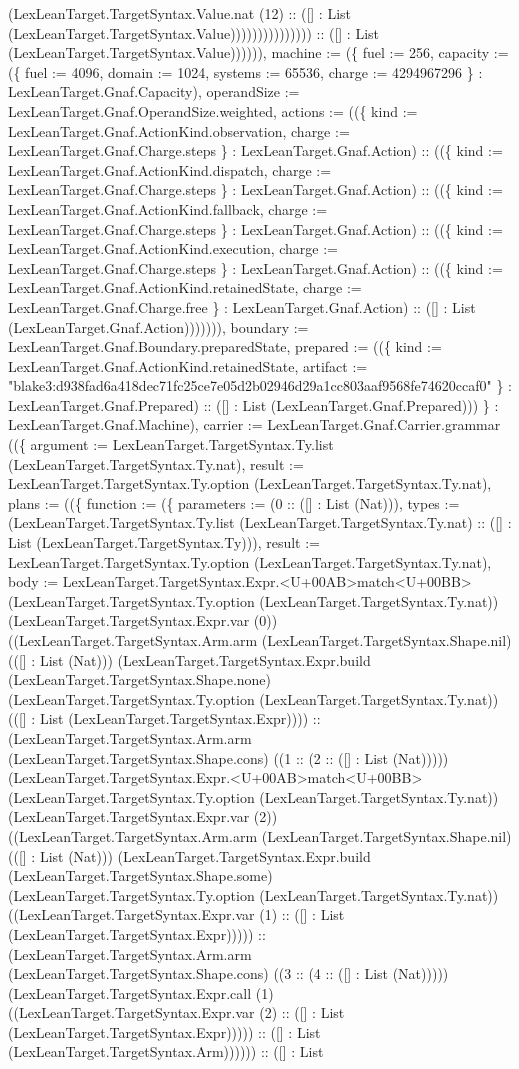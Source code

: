\documentclass[11pt]{article}
\begin{document}
(LexLeanTarget.TargetSyntax.Value.nat (12) :: ([] : List (LexLeanTarget.TargetSyntax.Value))))))))))))))) :: ([] : List (LexLeanTarget.TargetSyntax.Value)))))), machine := (\{ fuel := 256, capacity := (\{ fuel := 4096, domain := 1024, systems := 65536, charge := 4294967296 \} : LexLeanTarget.Gnaf.Capacity), operandSize := LexLeanTarget.Gnaf.OperandSize.weighted, actions := ((\{ kind := LexLeanTarget.Gnaf.ActionKind.observation, charge := LexLeanTarget.Gnaf.Charge.steps \} : LexLeanTarget.Gnaf.Action) :: ((\{ kind := LexLeanTarget.Gnaf.ActionKind.dispatch, charge := LexLeanTarget.Gnaf.Charge.steps \} : LexLeanTarget.Gnaf.Action) :: ((\{ kind := LexLeanTarget.Gnaf.ActionKind.fallback, charge := LexLeanTarget.Gnaf.Charge.steps \} : LexLeanTarget.Gnaf.Action) :: ((\{ kind := LexLeanTarget.Gnaf.ActionKind.execution, charge := LexLeanTarget.Gnaf.Charge.steps \} : LexLeanTarget.Gnaf.Action) :: ((\{ kind := LexLeanTarget.Gnaf.ActionKind.retainedState, charge := LexLeanTarget.Gnaf.Charge.free \} : LexLeanTarget.Gnaf.Action) :: ([] : List (LexLeanTarget.Gnaf.Action))))))), boundary := LexLeanTarget.Gnaf.Boundary.preparedState, prepared := ((\{ kind := LexLeanTarget.Gnaf.ActionKind.retainedState, artifact := "blake3:d938fad6a418dec71fc25ce7e05d2b02946d29a1cc803aaf9568fe74620ccaf0" \} : LexLeanTarget.Gnaf.Prepared) :: ([] : List (LexLeanTarget.Gnaf.Prepared))) \} : LexLeanTarget.Gnaf.Machine), carrier := LexLeanTarget.Gnaf.Carrier.grammar ((\{ argument := LexLeanTarget.TargetSyntax.Ty.list (LexLeanTarget.TargetSyntax.Ty.nat), result := LexLeanTarget.TargetSyntax.Ty.option (LexLeanTarget.TargetSyntax.Ty.nat), plans := ((\{ function := (\{ parameters := (0 :: ([] : List (Nat))), types := (LexLeanTarget.TargetSyntax.Ty.list (LexLeanTarget.TargetSyntax.Ty.nat) :: ([] : List (LexLeanTarget.TargetSyntax.Ty))), result := LexLeanTarget.TargetSyntax.Ty.option (LexLeanTarget.TargetSyntax.Ty.nat), body := LexLeanTarget.TargetSyntax.Expr.<U+00AB>match<U+00BB> (LexLeanTarget.TargetSyntax.Ty.option (LexLeanTarget.TargetSyntax.Ty.nat)) (LexLeanTarget.TargetSyntax.Expr.var (0)) ((LexLeanTarget.TargetSyntax.Arm.arm (LexLeanTarget.TargetSyntax.Shape.nil) (([] : List (Nat))) (LexLeanTarget.TargetSyntax.Expr.build (LexLeanTarget.TargetSyntax.Shape.none) (LexLeanTarget.TargetSyntax.Ty.option (LexLeanTarget.TargetSyntax.Ty.nat)) (([] : List (LexLeanTarget.TargetSyntax.Expr)))) :: (LexLeanTarget.TargetSyntax.Arm.arm (LexLeanTarget.TargetSyntax.Shape.cons) ((1 :: (2 :: ([] : List (Nat))))) (LexLeanTarget.TargetSyntax.Expr.<U+00AB>match<U+00BB> (LexLeanTarget.TargetSyntax.Ty.option (LexLeanTarget.TargetSyntax.Ty.nat)) (LexLeanTarget.TargetSyntax.Expr.var (2)) ((LexLeanTarget.TargetSyntax.Arm.arm (LexLeanTarget.TargetSyntax.Shape.nil) (([] : List (Nat))) (LexLeanTarget.TargetSyntax.Expr.build (LexLeanTarget.TargetSyntax.Shape.some) (LexLeanTarget.TargetSyntax.Ty.option (LexLeanTarget.TargetSyntax.Ty.nat)) ((LexLeanTarget.TargetSyntax.Expr.var (1) :: ([] : List (LexLeanTarget.TargetSyntax.Expr))))) :: (LexLeanTarget.TargetSyntax.Arm.arm (LexLeanTarget.TargetSyntax.Shape.cons) ((3 :: (4 :: ([] : List (Nat))))) (LexLeanTarget.TargetSyntax.Expr.call (1) ((LexLeanTarget.TargetSyntax.Expr.var (2) :: ([] : List (LexLeanTarget.TargetSyntax.Expr))))) :: ([] : List (LexLeanTarget.TargetSyntax.Arm)))))) :: ([] : List 
\end{document}
